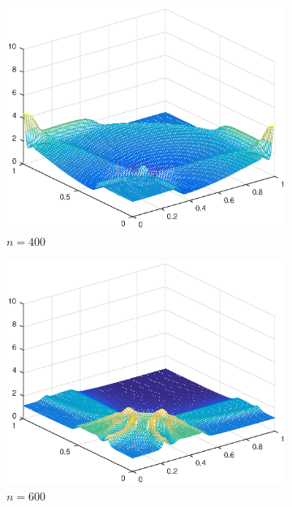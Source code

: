 \begin{figure}[h!]
\begin{subfigure}[t]{0.48\textwidth}
        \centering
        \includegraphics[width=\textwidth]{images/sol_ri_0400.eps}
        \caption{$n=400$}
        \label{fig:100}
    \end{subfigure}
    \begin{subfigure}[t]{0.48\textwidth}
        \centering
        \includegraphics[width=\textwidth]{images/sol_ri_0600.eps}
        \caption{$n=600$}
        \label{fig:100}
    \end{subfigure}
    \begin{subfigure}[t]{0.48\textwidth}
        \centering

\end{subfigure}
\end{figure}
